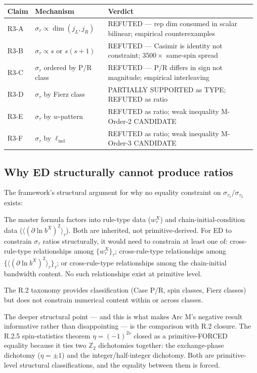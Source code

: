 \documentclass[11pt,a4paper]{article}
\begin{document}
\begin{center}
\small
\begin{tabular}{@{}llp{8cm}@{}}
\toprule
Claim & Mechanism & Verdict \\
\midrule
R3-A & $\sigma_\tau \propto \dim(j_L, j_R)$ & REFUTED --- rep dim consumed in scalar bilinear; empirical counterexamples \\
R3-B & $\sigma_\tau \propto s$ or $s(s+1)$ & REFUTED --- Casimir is identity not constraint; $3500\times$ same-spin spread \\
R3-C & $\sigma_\tau$ ordered by P/R class & REFUTED --- P/R differs in sign not magnitude; empirical interleaving \\
R3-D & $\sigma_\tau$ by Fierz class & PARTIALLY SUPPORTED as TYPE; REFUTED as ratio \\
R3-E & $\sigma_\tau$ by $w$-pattern & REFUTED as ratio; weak inequality M-Order-2 CANDIDATE \\
R3-F & $\sigma_\tau$ by $\ell_{\mathrm{ind}}$ & REFUTED as ratio; weak inequality M-Order-3 CANDIDATE \\
\bottomrule
\end{tabular}
\end{center}

\subsection{Why ED structurally cannot produce ratios}

The framework's structural argument for why no equality constraint on $\sigma_{\tau_1}/\sigma_{\tau_2}$ exists:

The master formula factors into rule-type data ($w_\tau^X$) and chain-initial-condition data ($\langle(\partial\ln b^X)^2\rangle_\tau$). Both are inherited, not primitive-derived. For ED to constrain $\sigma_\tau$ ratios structurally, it would need to constrain at least one of: cross-rule-type relationships among $\{w_\tau^X\}_\tau$; cross-rule-type relationships among $\{\langle(\partial\ln b^X)^2\rangle_\tau\}_\tau$; or cross-rule-type relationships among the chain-initial bandwidth content. No such relationships exist at primitive level.

The R.2 taxonomy provides classification (Case P/R, spin classes, Fierz classes) but does not constrain numerical content within or across classes.

The deeper structural point --- and this is what makes Arc M's negative result informative rather than disappointing --- is the comparison with R.2 closure. The R.2.5 spin-statistics theorem $\eta = (-1)^{2s}$ closed as a primitive-FORCED equality because it ties two $\mathbb{Z}_2$ dichotomies together: the exchange-phase dichotomy ($\eta = \pm 1$) and the integer/half-integer dichotomy. Both are primitive-level structural classifications, and the equality between them is forced.
\end{document}
